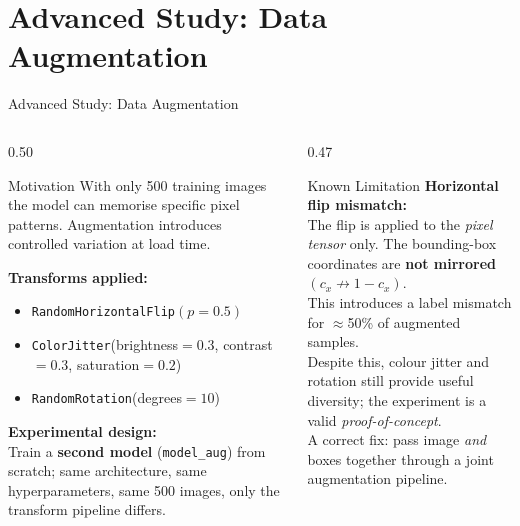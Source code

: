 \documentclass[aspectratio=169,10pt]{beamer}
\begin{document}
\section{Advanced Study: Data Augmentation}

\begin{frame}{Advanced Study: Data Augmentation}
\begin{columns}[T]
\begin{column}{0.50\textwidth}
  \begin{block}{Motivation}
    With only 500 training images the model can memorise
    specific pixel patterns. Augmentation introduces
    controlled variation at load time.
  \end{block}

  \vspace{0.1cm}
  \textbf{Transforms applied:}
  \begin{itemize}
    \item \texttt{RandomHorizontalFlip}$(p=0.5)$
    \item \texttt{ColorJitter}(brightness$=0.3$, contrast$=0.3$, saturation$=0.2$)
    \item \texttt{RandomRotation}(degrees$=10$)
  \end{itemize}

  \vspace{0.1cm}
  \textbf{Experimental design:}\\
  Train a \textbf{second model} (\texttt{model\_aug}) from scratch;
  same architecture, same hyperparameters, same 500 images,
  only the transform pipeline differs.
\end{column}
\begin{column}{0.47\textwidth}
  \begin{alertblock}{Known Limitation}
    \textbf{Horizontal flip mismatch:}\\[4pt]
    The flip is applied to the \emph{pixel tensor} only.
    The bounding-box coordinates are \textbf{not mirrored}
    $(c_x \not\to 1-c_x)$.\\[4pt]
    This introduces a label mismatch for $\approx$50\% of
    augmented samples.\\[4pt]
    Despite this, colour jitter and rotation still provide
    useful diversity; the experiment is a valid
    \textit{proof-of-concept}.\\[4pt]
    A correct fix: pass image \emph{and} boxes together
    through a joint augmentation pipeline.
  \end{alertblock}
\end{column}
\end{columns}
\end{frame}
\end{document}
